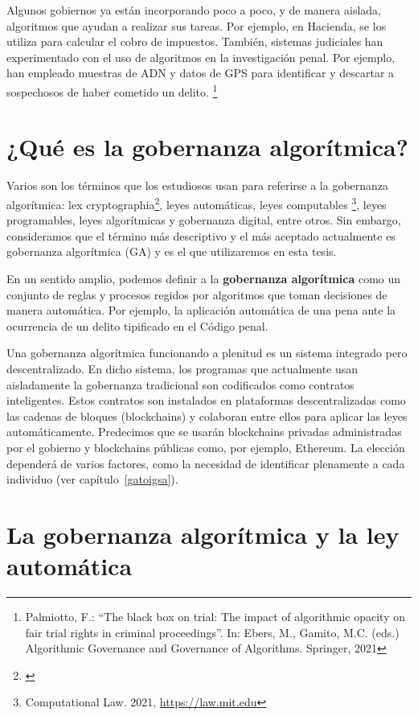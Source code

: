 \documentclass[12pt]{report} %
\begin{document}
Algunos gobiernos ya están incorporando poco a poco, y de manera aislada, algoritmos que ayudan a realizar sus tareas. Por ejemplo, en Hacienda, se los utiliza para calcular el cobro de impuestos. También, sistemas judiciales han experimentado con el uso de algoritmos en la investigación penal. Por ejemplo, han empleado muestras de ADN y datos de GPS para identificar y descartar a sospechosos de haber cometido un delito. \footnote{Palmiotto, F.: “The black box on trial: The impact of algorithmic opacity on fair
trial rights in criminal proceedings”. In: Ebers, M., Gamito, M.C. (eds.) Algorithmic
Governance and Governance of Algorithms. Springer, 2021}


\section{¿Qué es la gobernanza algorítmica?}
Varios son los términos que los estudiosos usan para referirse a la gobernanza algorítmica: lex cryptographia\footnote{\cite{PrimaveraAaron2018} }, leyes automáticas, leyes computables \footnote{Computational Law. 2021, \url{https://law.mit.edu}}, leyes programables, leyes algorítmicas y gobernanza digital, entre otros. Sin embargo, consideramos que el término más descriptivo y el más aceptado actualmente es gobernanza algorítmica (GA) y es el que utilizaremos en esta tesis.

En un sentido amplio, podemos definir a la \textbf{ gobernanza algorítmica } como un conjunto de reglas y procesos regidos por algoritmos que toman decisiones de manera automática. Por ejemplo, la aplicación automática de una pena ante la ocurrencia de un delito tipificado en el Código penal.

Una gobernanza algorítmica funcionando a plenitud es un sistema integrado pero descentralizado. En dicho sistema, los programas que actualmente usan aisladamente la gobernanza tradicional son codificados como contratos inteligentes. Estos contratos son instalados en plataformas descentralizadas como las cadenas de bloques (blockchains) y colaboran entre ellos para aplicar las leyes automáticamente. Predecimos que se usarán blockchains privadas administradas por el gobierno y blockchains públicas como, por ejemplo, Ethereum. La elección dependerá de varios factores, como la necesidad de identificar plenamente a cada individuo (ver capítulo~\ref{gatoigsa}).	

\section{La gobernanza algorítmica y la ley automática}
\end{document}

